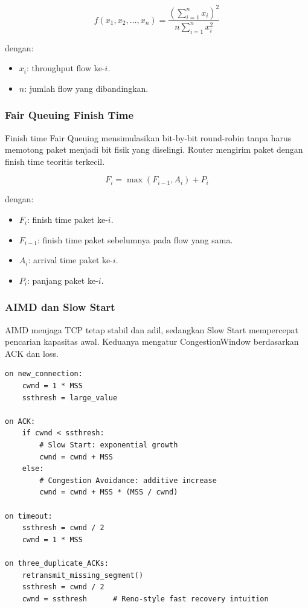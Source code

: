 \begin{equation}
    f(x_1,x_2,\ldots,x_n)
    =
    \frac{\left(\sum_{i=1}^{n}x_i\right)^2}
    {n\sum_{i=1}^{n}x_i^2}
    \label{eq:jain-fairness}
\end{equation}

dengan:
\begin{itemize}
    \item $x_i$: throughput flow ke-$i$.
    \item $n$: jumlah flow yang dibandingkan.
\end{itemize}

\subsubsection{Fair Queuing Finish Time}
\begin{jawab}
Finish time Fair Queuing mensimulasikan bit-by-bit round-robin tanpa harus memotong paket menjadi bit fisik yang diselingi. Router mengirim paket dengan finish time teoritis terkecil.
\end{jawab}

\begin{equation}
    F_i = \max(F_{i-1}, A_i) + P_i
    \label{eq:fq-finish-time}
\end{equation}

dengan:
\begin{itemize}
    \item $F_i$: finish time paket ke-$i$.
    \item $F_{i-1}$: finish time paket sebelumnya pada flow yang sama.
    \item $A_i$: arrival time paket ke-$i$.
    \item $P_i$: panjang paket ke-$i$.
\end{itemize}

\subsubsection{AIMD dan Slow Start}
\begin{jawab}
AIMD menjaga TCP tetap stabil dan adil, sedangkan Slow Start mempercepat pencarian kapasitas awal. Keduanya mengatur CongestionWindow berdasarkan ACK dan loss.
\end{jawab}

\begin{lstlisting}[caption={Pseudocode TCP congestion control ringkas}, label={lst:tcp-congestion}]
on new_connection:
    cwnd = 1 * MSS
    ssthresh = large_value

on ACK:
    if cwnd < ssthresh:
        # Slow Start: exponential growth
        cwnd = cwnd + MSS
    else:
        # Congestion Avoidance: additive increase
        cwnd = cwnd + MSS * (MSS / cwnd)

on timeout:
    ssthresh = cwnd / 2
    cwnd = 1 * MSS

on three_duplicate_ACKs:
    retransmit_missing_segment()
    ssthresh = cwnd / 2
    cwnd = ssthresh      # Reno-style fast recovery intuition
\end{lstlisting}

